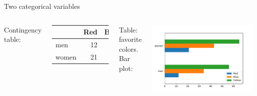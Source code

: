 \documentclass[aspectratio=169,usenames,dvipsnames]{beamer}
\begin{document}
\begin{frame}{Two categorical variables}
    \begin{columns}
            Contingency table:

            \begin{tabular}{lrrr}
                & Red & Blue & Yellow \\ \midrule
            men   & 12  & 34 & 56 \\
            women & 21  & 43 & 65 \\
            \end{tabular}

            \vspace{1em}
            Table: favorite colors.
            Bar plot:

            \includegraphics[width=\linewidth]{fig/barcatcont}
    \end{columns}
\end{frame}
\end{document}
